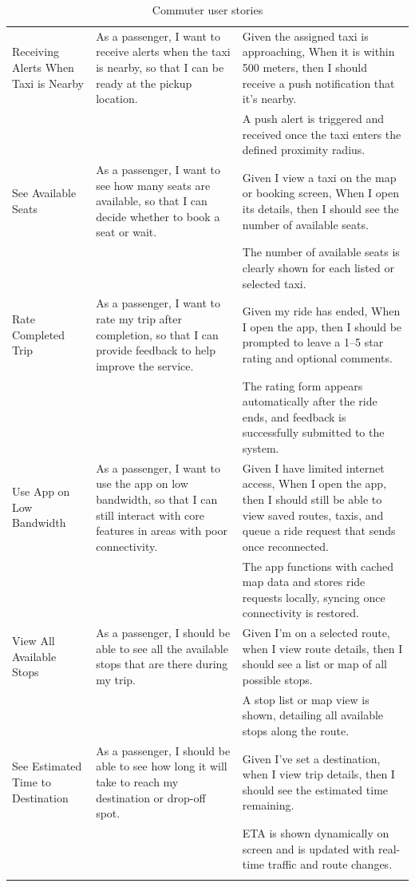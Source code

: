 \documentclass[a4paper,12pt]{article}
\begin{document}
\begin{longtable}{|p{4cm}|p{6cm}|p{5cm}|}
\hline
Receiving Alerts When Taxi is Nearby & As a passenger, I want to receive alerts when the taxi is nearby, so that I can be ready at the pickup location. & Given the assigned taxi is approaching, When it is within 500 meters, then I should receive a push notification that it’s nearby. \\
& & A push alert is triggered and received once the taxi enters the defined proximity radius. \\
\hline
See Available Seats & As a passenger, I want to see how many seats are available, so that I can decide whether to book a seat or wait. & Given I view a taxi on the map or booking screen, When I open its details, then I should see the number of available seats. \\
& & The number of available seats is clearly shown for each listed or selected taxi. \\
\hline
Rate Completed Trip & As a passenger, I want to rate my trip after completion, so that I can provide feedback to help improve the service. & Given my ride has ended, When I open the app, then I should be prompted to leave a 1–5 star rating and optional comments. \\
& & The rating form appears automatically after the ride ends, and feedback is successfully submitted to the system. \\
\hline
Use App on Low Bandwidth & As a passenger, I want to use the app on low bandwidth, so that I can still interact with core features in areas with poor connectivity. & Given I have limited internet access, When I open the app, then I should still be able to view saved routes, taxis, and queue a ride request that sends once reconnected. \\
& & The app functions with cached map data and stores ride requests locally, syncing once connectivity is restored. \\
\hline
View All Available Stops & As a passenger, I should be able to see all the available stops that are there during my trip. & Given I’m on a selected route, when I view route details, then I should see a list or map of all possible stops. \\
& & A stop list or map view is shown, detailing all available stops along the route. \\
\hline
See Estimated Time to Destination & As a passenger, I should be able to see how long it will take to reach my destination or drop-off spot. & Given I’ve set a destination, when I view trip details, then I should see the estimated time remaining. \\
& & ETA is shown dynamically on screen and is updated with real-time traffic and route changes. \\
\hline
\caption{Commuter user stories}
\label{tab:commuter-user-stories}
\end{longtable}
\end{document}
